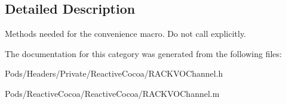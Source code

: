 \subsection{Detailed Description}
Methods needed for the convenience macro. Do not call explicitly. 

The documentation for this category was generated from the following files\+:\begin{DoxyCompactItemize}
\item 
Pods/\+Headers/\+Private/\+Reactive\+Cocoa/R\+A\+C\+K\+V\+O\+Channel.\+h\item 
Pods/\+Reactive\+Cocoa/\+Reactive\+Cocoa/R\+A\+C\+K\+V\+O\+Channel.\+m\end{DoxyCompactItemize}
